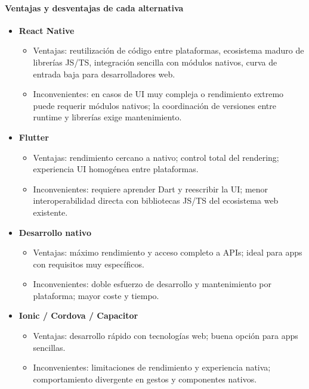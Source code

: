 \documentclass[twoside, openright, 11pt]{report}
\begin{document}
	\paragraph{Ventajas y desventajas de cada alternativa}
	\begin{itemize}
		\item \textbf{React Native}
		\begin{itemize}
			\item Ventajas: reutilización de código entre plataformas, ecosistema maduro de librerías JS/TS, integración sencilla con módulos nativos, curva de entrada baja para desarrolladores web.
			\item Inconvenientes: en casos de UI muy compleja o rendimiento extremo puede requerir módulos nativos; la coordinación de versiones entre runtime y librerías exige mantenimiento.
		\end{itemize}
		
		\item \textbf{Flutter}
		\begin{itemize}
			\item Ventajas: rendimiento cercano a nativo; control total del rendering; experiencia UI homogénea entre plataformas.
			\item Inconvenientes: requiere aprender Dart y reescribir la UI; menor interoperabilidad directa con bibliotecas JS/TS del ecosistema web existente.
		\end{itemize}
		
		\item \textbf{Desarrollo nativo}
		\begin{itemize}
			\item Ventajas: máximo rendimiento y acceso completo a APIs; ideal para apps con requisitos muy específicos.
			\item Inconvenientes: doble esfuerzo de desarrollo y mantenimiento por plataforma; mayor coste y tiempo.
		\end{itemize}
		
		\item \textbf{Ionic / Cordova / Capacitor}
		\begin{itemize}
			\item Ventajas: desarrollo rápido con tecnologías web; buena opción para apps sencillas.
			\item Inconvenientes: limitaciones de rendimiento y experiencia nativa; comportamiento divergente en gestos y componentes nativos.
		\end{itemize}
	\end{itemize}
	
\end{document}
